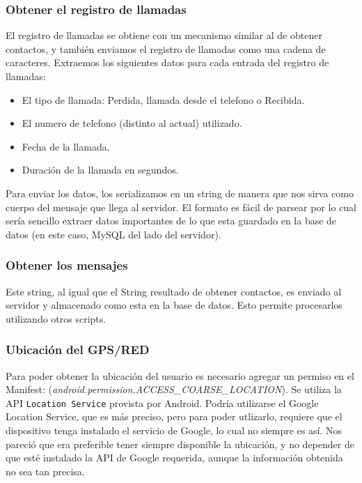 \subsubsection{Obtener el registro de llamadas}

El registro de llamadas se obtiene con un mecanismo similar al de obtener contactos, y también
enviamos el registro de llamadas como una cadena de caracteres. Extraemos los siguientes datos
para cada entrada del registro de llamadas:

\begin{itemize}
	\item El tipo de llamada: Perdida, llamada desde el telefono o Recibida.
	\item El numero de telefono (distinto al actual) utilizado.
	\item Fecha de la llamada.
	\item Duración de la llamada en segundos.
\end{itemize}

Para enviar los datos, los serializamos en un string de manera que nos sirva como
cuerpo del mensaje que llega al servidor. El formato es fácil de parsear por lo cual
sería sencillo extraer datos importantes de lo que esta guardado en la base de datos
(en este caso, MySQL del lado del servidor).

\subsubsection{Obtener los mensajes}

Este string, al igual que el String resultado de obtener contactos, es enviado al
servidor y almacenado como esta en la base de datos. Esto permite procesarlos
utilizando otros scripts.

\subsubsection{Ubicación del GPS/RED}

Para poder obtener la ubicación del usuario es necesario agregar un permiso en el Manifest: (\textit{android.permission.ACCESS\_COARSE\_LOCATION}). Se utiliza la API {\tt Location Service} provista por Android. Podría utilizarse el Google Location Service, que es más preciso, pero para poder utlizarlo, requiere que el dispositivo tenga instalado el servicio de Google, lo cual no siempre es así. Nos pareció que era preferible tener siempre disponible la ubicación, y no depender de que esté instalado la API de Google requerida, aunque la información obtenida no sea tan precisa.



